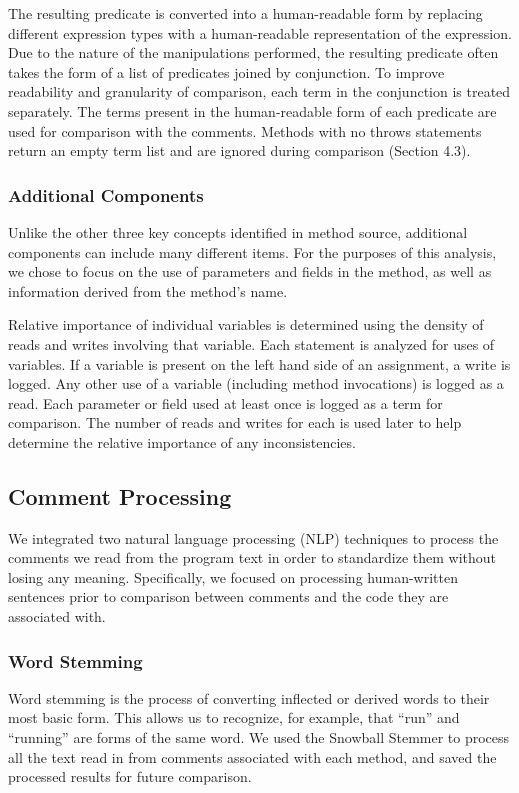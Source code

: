 \documentclass[preprint]{sigplanconf}
\begin{document}
The resulting predicate is converted into a human-readable form by replacing different expression types with a human-readable representation of the expression. Due to the nature of the manipulations performed, the resulting predicate often takes the form of a list of predicates joined by conjunction. To improve readability and granularity of comparison, each term in the conjunction is treated separately. The terms present in the human-readable form of each predicate are used for comparison with the comments. Methods with no throws statements return an empty term list and are ignored during comparison (Section 4.3).

\subsubsection{Additional Components}
Unlike the other three key concepts identified in method source, additional components can include many different items. For the purposes of this analysis, we chose to focus on the use of parameters and fields in the method, as well as information derived from the method's name.

Relative importance of individual variables is determined using the density of reads and writes involving that variable. Each statement is analyzed for uses of variables. If a variable is present on the left hand side of an assignment, a write is logged. Any other use of a variable (including method invocations) is logged as a read. Each parameter or field used at least once is logged as a term for comparison. The number of reads and writes for each is used later to help determine the relative importance of any inconsistencies.

\subsection{Comment Processing}
We integrated two natural language processing (NLP) techniques to process the comments we read from the program text in order to standardize them without losing any meaning. Specifically, we focused on processing human-written sentences prior to comparison between comments and the code they are associated with.

\subsubsection{Word Stemming}
Word stemming is the process of converting inflected or derived words to their most basic form. This allows us to recognize, for example, that ``run'' and ``running'' are forms of the same word. We used the Snowball Stemmer to process all the text read in from comments associated with each method, and saved the processed results for future comparison.
\end{document}
